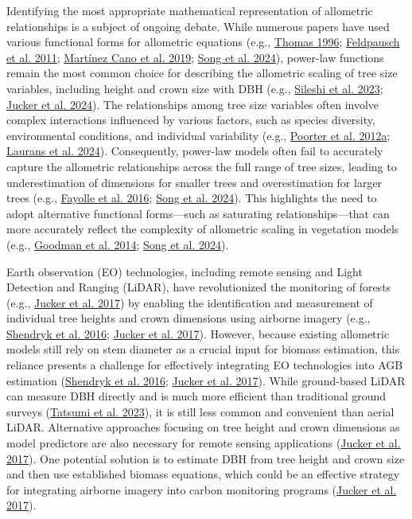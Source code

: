 \documentclass[
  12pt,
  letterpaper,
  DIV=11,
  numbers=noendperiod]{scrartcl}
\begin{document}
Identifying the most appropriate mathematical representation of
allometric relationships is a subject of ongoing debate. While numerous
papers have used various functional forms for allometric equations
(e.g., \protect\hyperlink{ref-Thomas1996}{Thomas 1996};
\protect\hyperlink{ref-Feldpausch2011}{Feldpausch et al. 2011};
\protect\hyperlink{ref-MartinezCano2019}{Martínez Cano et al. 2019};
\protect\hyperlink{ref-Song2024}{Song et al. 2024}), power-law functions
remain the most common choice for describing the allometric scaling of
tree size variables, including height and crown size with DBH (e.g.,
\protect\hyperlink{ref-Sileshi2023}{Sileshi et al. 2023};
\protect\hyperlink{ref-Jucker2024}{Jucker et al. 2024}). The
relationships among tree size variables often involve complex
interactions influenced by various factors, such as species diversity,
environmental conditions, and individual variability (e.g.,
\protect\hyperlink{ref-Poorter2012a}{Poorter et al. 2012a};
\protect\hyperlink{ref-Laurans2024}{Laurans et al. 2024}). Consequently,
power-law models often fail to accurately capture the allometric
relationships across the full range of tree sizes, leading to
underestimation of dimensions for smaller trees and overestimation for
larger trees (e.g., \protect\hyperlink{ref-Fayolle2016}{Fayolle et al.
2016}; \protect\hyperlink{ref-Song2024}{Song et al. 2024}). This
highlights the need to adopt alternative functional forms---such as
saturating relationships---that can more accurately reflect the
complexity of allometric scaling in vegetation models (e.g.,
\protect\hyperlink{ref-Goodman2014}{Goodman et al. 2014};
\protect\hyperlink{ref-Song2024}{Song et al. 2024}).

Earth observation (EO) technologies, including remote sensing and Light
Detection and Ranging (LiDAR), have revolutionized the monitoring of
forests (e.g., \protect\hyperlink{ref-Jucker2017}{Jucker et al. 2017})
by enabling the identification and measurement of individual tree
heights and crown dimensions using airborne imagery (e.g.,
\protect\hyperlink{ref-Shendryk2016}{Shendryk et al. 2016};
\protect\hyperlink{ref-Jucker2017}{Jucker et al. 2017}). However,
because existing allometric models still rely on stem diameter as a
crucial input for biomass estimation, this reliance presents a challenge
for effectively integrating EO technologies into AGB estimation
(\protect\hyperlink{ref-Shendryk2016}{Shendryk et al. 2016};
\protect\hyperlink{ref-Jucker2017}{Jucker et al. 2017}). While
ground-based LiDAR can measure DBH directly and is much more efficient
than traditional ground surveys
(\protect\hyperlink{ref-Tatsumi2023}{Tatsumi et al. 2023}), it is still
less common and convenient than aerial LiDAR. Alternative approaches
focusing on tree height and crown dimensions as model predictors are
also necessary for remote sensing applications
(\protect\hyperlink{ref-Jucker2017}{Jucker et al. 2017}). One potential
solution is to estimate DBH from tree height and crown size and then use
established biomass equations, which could be an effective strategy for
integrating airborne imagery into carbon monitoring programs
(\protect\hyperlink{ref-Jucker2017}{Jucker et al. 2017}).
\end{document}
